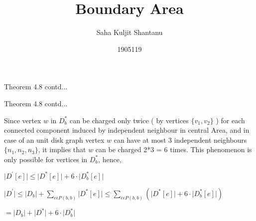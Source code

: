 \documentclass{beamer}
\title{Boundary Area}
\author{Saha Kuljit Shantanu}
\date{1905119}
\begin{document}
\maketitle

\setcounter{framenumber}{54}

\begin{frame}{Theorem 4.8 contd...}



\end{frame}

\begin{frame}{Theorem 4.8 contd...}

\setcounter{equation}{7}


\begin{exampleblock}{}

    Since vertex $w$ in $D_b^*$ can be charged only twice ( by vertices $\{v_1,v_2\}$ ) for each connected component induced by independent neighbour in central Area, and in case of an unit disk graph vertex $w$ can have at most 3 independent neighbours $\{n_1,n_2,n_3\}$, it implies that $w$ can be charged 2*3 = 6 times. This phenomenon is only possible for vertices in $D_b^*$, hence,

    

    \vspace{0.5em}

    $\lvert D^\prime[e] \rvert \le \lvert D^*[e] \rvert + 6 \cdot \lvert D^*_b[e] \rvert$ 

    \vspace{0.5em}
    
    $\lvert D^\prime \rvert \le \lvert D_b \rvert + \displaystyle \sum_{e \epsilon P(b,b) } \lvert D^*[e] \rvert \le \displaystyle \sum_{e \epsilon P(b,b) } \left(  \lvert D^*[e] \rvert + 6 \cdot \lvert D^*_b[e] \rvert \right) $ 

    \vspace{1em}

    $ = \lvert D_b \rvert + \lvert D^* \rvert + 6 \cdot \lvert D_b^* \rvert $

    \vspace{1em}

\end{exampleblock}    

\end{frame}
\end{document}
